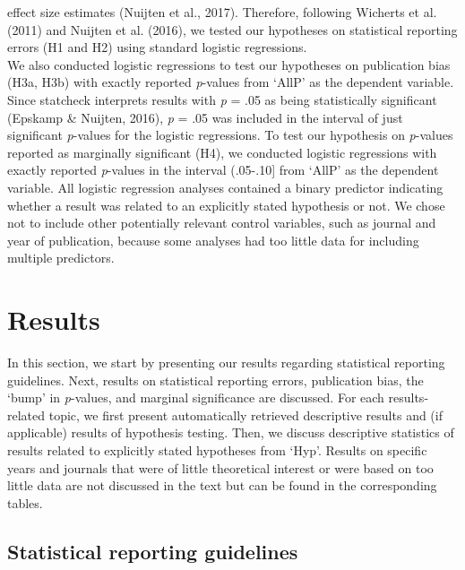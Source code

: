 \documentclass[
  12pt,
]{article}
\begin{document}
effect size estimates (Nuijten et al., 2017). Therefore, following
Wicherts et al. (2011) and Nuijten et al. (2016), we tested our
hypotheses on statistical reporting errors (H1 and H2) using standard
logistic regressions.~\\
\hspace*{0.333em}\hspace*{0.333em}\hspace*{0.333em}\hspace*{0.333em}We
also conducted logistic regressions to test our hypotheses on
publication bias (H3a, H3b) with exactly reported \emph{p}-values from
`AllP' as the dependent variable. Since statcheck interprets results
with \emph{p} = .05 as being statistically significant (Epskamp \&
Nuijten, 2016), \emph{p} = .05 was included in the interval of just
significant \emph{p}-values for the logistic regressions. To test our
hypothesis on \emph{p}-values reported as marginally significant (H4),
we conducted logistic regressions with exactly reported \emph{p}-values
in the interval (.05-.10{]} from `AllP' as the dependent variable. All
logistic regression analyses contained a binary predictor indicating
whether a result was related to an explicitly stated hypothesis or not.
We chose not to include other potentially relevant control variables,
such as journal and year of publication, because some analyses had too
little data for including multiple predictors.

\vspace{2cm}

\hypertarget{results}{%
\section{Results}\label{results}}

In this section, we start by presenting our results regarding
statistical reporting guidelines. Next, results on statistical reporting
errors, publication bias, the `bump' in \emph{p}-values, and marginal
significance are discussed. For each results-related topic, we first
present automatically retrieved descriptive results and (if applicable)
results of hypothesis testing. Then, we discuss descriptive statistics
of results related to explicitly stated hypotheses from `Hyp'. Results
on specific years and journals that were of little theoretical interest
or were based on too little data are not discussed in the text but can
be found in the corresponding tables.\\

\hypertarget{statistical-reporting-guidelines}{%
\subsection{Statistical reporting
guidelines}\label{statistical-reporting-guidelines}}
\end{document}

